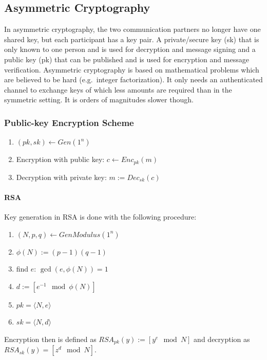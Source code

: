 \subsection{Asymmetric Cryptography}
In asymmetric cryptography, the two communication partners no longer have one shared key, but each participant has a key pair.
A private/secure key (sk) that is only known to one person and is used for decryption and message signing and a public key (pk) that can be published and is used for encryption and message verification.
Asymmetric cryptography is based on mathematical problems which are believed to be hard (e.g.\ integer factorization).
It only needs an authenticated channel to exchange keys of which less amounts are required than in the symmetric setting.
It is orders of magnitudes slower though.

\subsubsection{Public-key Encryption Scheme}
\begin{enumerate}
  \item $(pk,sk) \leftarrow Gen(1^n)$
  \item Encryption with public key: $c \leftarrow Enc_{pk}(m)$
  \item Decryption with private key: $m := Dec_{sk}(c)$
\end{enumerate}

\paragraph{RSA}
Key generation in RSA is done with the following procedure:
\begin{enumerate}
  \item $(N,p,q) \leftarrow GenModulus(1^n)$
  \item $\phi(N) := (p-1)(q-1)$
  \item find $e$: $\gcd(e,\phi(N)) = 1$
  \item $d := [e^{-1} \mod \phi(N)]$
  \item $pk = \langle N,e \rangle$
  \item $sk = \langle N,d \rangle$
\end{enumerate}

Encryption then is defined as $RSA_{pk}(y) := [y^e \mod N]$ and decryption as $RSA_{sk}(y) = [z^d \mod N]$.

